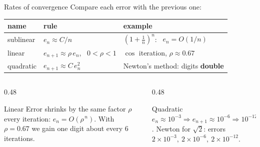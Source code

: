 \documentclass[aspectratio=169]{beamer}
\begin{document}
\begin{frame}{Rates of convergence}
\small
Compare each error with the previous one:
\begin{center}
\footnotesize
\begin{tabular}{lll}
\toprule
name & rule & example \\
\midrule
sublinear & $e_n \approx C/n$ & $(1+\frac1n)^n$: \ $e_n = O(1/n)$ \\
linear & $e_{n+1} \approx \rho\, e_n$, \ $0<\rho<1$ & $\cos$ iteration, $\rho \approx 0.67$ \\
quadratic & $e_{n+1} \approx C\, e_n^{2}$ & Newton's method: digits \textbf{double} \\
\bottomrule
\end{tabular}
\end{center}

\begin{columns}[T]
\begin{column}{0.48\textwidth}
\begin{block}{Linear}
Error shrinks by the same factor $\rho$ every iteration: $e_n = O(\rho^{\,n})$.
With $\rho = 0.67$ we gain one digit about every 6 iterations.
\end{block}
\end{column}
\begin{column}{0.48\textwidth}
\begin{block}{Quadratic}
$e_n \approx 10^{-3} \Rightarrow e_{n+1} \approx 10^{-6} \Rightarrow 10^{-12}$.
Newton for $\sqrt2$: errors $2\!\times\!10^{-3},\ 2\!\times\!10^{-6},\ 2\!\times\!10^{-12}$.
\end{block}
\end{column}
\end{columns}
\end{frame}
\end{document}
